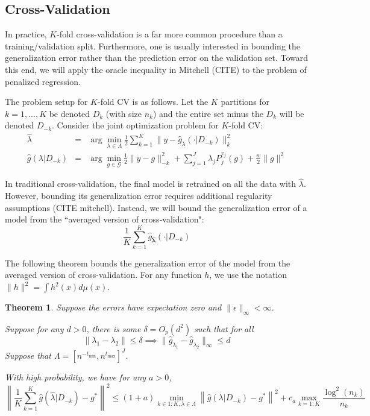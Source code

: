 \documentclass[12pt]{article}
\newtheorem{theorem}{Theorem}
\begin{document}
\subsection{Cross-Validation}

In practice, $K$-fold cross-validation is a far more common procedure than a training/validation split. Furthermore, one is usually interested in bounding the generalization error rather than the prediction error on the validation set. Toward this end, we will apply the oracle inequality in Mitchell (CITE) to the problem of penalized regression. 

The problem setup for $K$-fold CV is as follows. Let the $K$ partitions for $k=1,...,K$ be denoted $D_k$ (with size $n_k$) and the entire set minus the $D_k$ will be denoted $D_{-k}$. Consider the joint optimization problem for $K$-fold CV:
\begin{eqnarray}
\label{kfold_opt}
\hat{\lambda} &=& \arg\min_{\lambda\in\Lambda} \frac{1}{2} \sum_{k=1}^K  \| y-\hat{g}_{\lambda}(\cdot| D_{-k}) \|_{k}^{2} \\
\hat{g}(\lambda | D_{-k})&=&\arg\min_{g\in\mathcal{G}} \frac{1}{2} \| y-g \|_{-k}^{2} + \sum_{j=1}^J \lambda_j P_j^{v_j}(g) + \frac{w}{2} \|g\|^2
\end{eqnarray}

In traditional cross-validation, the final model is retrained on all the data with $\hat{\lambda}$. However, bounding its generalization error requires additional regularity assumptions (CITE mitchell). Instead, we will bound the generalization error of a model from the ``averaged version of cross-validation":
\begin{equation}
\frac{1}{K} \sum_{k=1}^K \hat{g}_{\hat{\boldsymbol \lambda}}(\cdot | D_{-k})
\end{equation}

The following theorem bounds the generalization error of the model from the averaged version of cross-validation. For any function $h$, we use the notation $\| h \|^2 = \int h^2(x) d\mu(x)$.
\begin{theorem}
\label{kfold_thrm}
Suppose the errors have expectation zero and $\| \epsilon \|_\infty < \infty $.

Suppose for any $d> 0$, there is some $\delta = O_p(d^2)$ such that for all
\begin{equation}
\| \lambda_1 - \lambda_2 \| \le \delta \implies \| \hat{g}_{\lambda_1} - \hat{g}_{\lambda_2} \|_\infty \le d
\end{equation}
Suppose that $\Lambda = [ n^{-t_{\min}}, n^{t_{\max}} ]^J $.


With high probability, we have for any $a > 0$,
\begin{equation}
\label{smooth_error_bound}
\left \| \frac{1}{K}\sum_{k=1}^K \hat{g}(\hat{\lambda} | D_{-k}) - g^* \right \|^2 \le
(1+a) \min_{k\in 1:K, \lambda \in \Lambda} \left \| \hat{g}(\lambda | D_{-k}) - g^* \right \|^2
+ c_a \max_{k=1:K} \frac{\log^2(n_k)}{n_k}
\end{equation}
\end{theorem}
\end{document}
